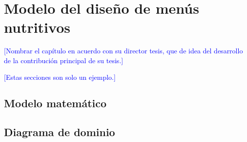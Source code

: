 \chapter{Modelo del diseño de menús nutritivos}\label{cap3:modelo}

\textcolor{blue}{[Nombrar el capítulo en acuerdo con su director tesis, que de 
 idea del desarrollo de la contribución principal de su tesis.]}
\bigskip

\textcolor{blue}{[Estas secciones son solo un ejemplo.]}
 
\section{Modelo matemático}

\section{Diagrama de dominio}

